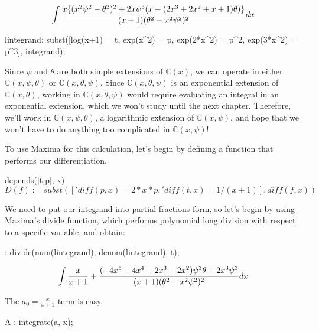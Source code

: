 

$$\int{{x\{(x^2 \psi^2-\theta^2)^2+2x \psi^3(x-(2x^3+2x^2+x+1)\theta)\}}\over{(x+1)(\theta^2 - x^2\psi^2)^2}} dx$$

\begin{maximacode}
lintegrand:
   subst([log(x+1) = t,
          exp(x^2) = p,
          exp(2*x^2) = p^2,
          exp(3*x^2) = p^3],
      integrand);
\end{maximacode}

Since $\psi$ and $\theta$ are both simple extensions of ${\mathbb C}(x)$, we can operate in either
${\mathbb C}(x,\psi,\theta)$ or ${\mathbb C}(x,\theta,\psi)$.  Since ${\mathbb C}(x,\theta,\psi)$
is an exponential extension of ${\mathbb C}(x,\theta)$, working in ${\mathbb C}(x,\theta,\psi)$
would require evaluating an integral in an exponential extension, which we won't study until
the next chapter.  Therefore, we'll work in ${\mathbb C}(x,\psi,\theta)$, a logarithmic
extension of ${\mathbb C}(x,\psi)$, and hope that we won't have to do anything
too complicated in ${\mathbb C}(x,\psi)$!

To use Maxima for this calculation, let's begin by defining
a function that performs our differentiation.

\begin{maximacode}
depends([t,p], x)$
D(f) := subst(['diff(p,x) = 2*x*p,
               'diff(t,x) = 1/(x+1)],
              diff(f,x))$
\end{maximacode}

We need to put our integrand into partial fractions form, so let's begin by
using Maxima's {\ttfamily divide} function, which performs polynomial long division
with respect to a specific variable, and obtain:

\begin{maximacode}
[a, N]:
   divide(num(lintegrand),
          denom(lintegrand), t);
\end{maximacode}


$$\int {x\over{x+1}} + {{(-4x^5-4x^4-2x^3-2x^2)\psi^3\theta + {2x^3}\psi^3}\over{(x+1)(\theta^2 - x^2\psi^2)^2}} dx$$

The $a_0 = \frac{x}{x+1}$ term is easy.

\begin{maximacode}
A : integrate(a, x);
\end{maximacode}


